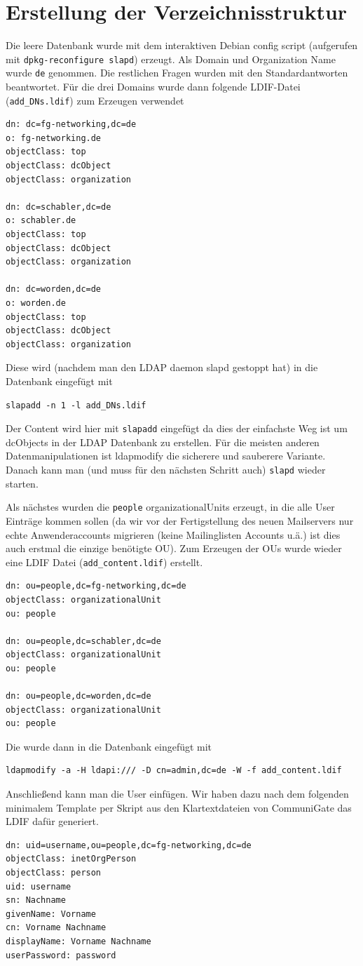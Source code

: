 \documentclass[11pt,a4paper,titlepage=firstiscover,headsepline,bibtotoc]{scrartcl} %
\begin{document}
\section{Erstellung der Verzeichnisstruktur}\label{sec:Erstelle-DB}
Die leere Datenbank wurde mit dem interaktiven Debian config script (aufgerufen mit \texttt{dpkg-reconfigure slapd}) erzeugt. Als Domain und Organization Name wurde \texttt{de} genommen. Die restlichen Fragen wurden mit den Standardantworten beantwortet. Für die drei Domains wurde dann folgende LDIF-Datei (\texttt{add\_DNs.ldif}) zum Erzeugen verwendet
\begin{lstlisting}
dn: dc=fg-networking,dc=de
o: fg-networking.de
objectClass: top
objectClass: dcObject
objectClass: organization

dn: dc=schabler,dc=de
o: schabler.de
objectClass: top
objectClass: dcObject
objectClass: organization

dn: dc=worden,dc=de
o: worden.de
objectClass: top
objectClass: dcObject
objectClass: organization

\end{lstlisting}
Diese wird (nachdem man den LDAP daemon slapd gestoppt hat) in die Datenbank eingefügt mit
\begin{lstlisting}
slapadd -n 1 -l add_DNs.ldif
\end{lstlisting}
Der Content wird hier mit \texttt{slapadd} eingefügt da dies der einfachste Weg ist um dcObjects in der LDAP Datenbank zu erstellen. Für die meisten anderen Datenmanipulationen ist ldapmodify die sicherere und sauberere Variante. Danach kann man (und muss für den nächsten Schritt auch) \texttt{slapd} wieder starten.

Als nächstes wurden die \texttt{people} organizationalUnits erzeugt, in die alle User Einträge kommen sollen (da wir vor der Fertigstellung des neuen Mailservers nur echte Anwenderaccounts migrieren (keine Mailinglisten Accounts u.ä.) ist dies auch erstmal die einzige benötigte OU). Zum Erzeugen der OUs wurde wieder eine LDIF Datei (\texttt{add\_content.ldif}) erstellt.
\begin{lstlisting}
dn: ou=people,dc=fg-networking,dc=de
objectClass: organizationalUnit
ou: people

dn: ou=people,dc=schabler,dc=de
objectClass: organizationalUnit
ou: people

dn: ou=people,dc=worden,dc=de
objectClass: organizationalUnit
ou: people
\end{lstlisting}
Die wurde dann in die Datenbank eingefügt mit
\begin{lstlisting}
ldapmodify -a -H ldapi:/// -D cn=admin,dc=de -W -f add_content.ldif
\end{lstlisting}
Anschließend kann man die User einfügen. Wir haben dazu nach dem folgenden minimalem Template per Skript aus den Klartextdateien von CommuniGate das LDIF dafür generiert.
\begin{lstlisting}
dn: uid=username,ou=people,dc=fg-networking,dc=de
objectClass: inetOrgPerson
objectClass: person
uid: username
sn: Nachname
givenName: Vorname
cn: Vorname Nachname
displayName: Vorname Nachname
userPassword: password
\end{lstlisting}
\end{document}

